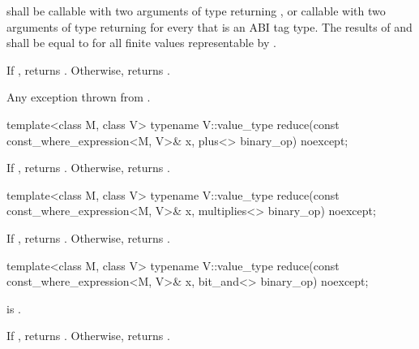 \begin{itemdescr}
  \pnum\requires
   shall be callable with two arguments of type  returning , or callable with two arguments of type  returning  for every  that is an ABI tag type. The results of  and  shall be equal to  for all finite values  representable by .

  \pnum\returns
  If , returns . Otherwise, returns  \forallmaskedi.

  \pnum\throws
  Any exception thrown from .
\end{itemdescr}

\begin{itemdecl}
template<class M, class V>
  typename V::value_type reduce(const const_where_expression<M, V>& x, plus<> binary_op) noexcept;
\end{itemdecl}

\begin{itemdescr}
  \pnum\returns
  If , returns . Otherwise, returns  \forallmaskedi.
\end{itemdescr}

\begin{itemdecl}
template<class M, class V>
  typename V::value_type reduce(const const_where_expression<M, V>& x, multiplies<> binary_op) noexcept;
\end{itemdecl}

\begin{itemdescr}
  \pnum\returns
  If , returns . Otherwise, returns  \forallmaskedi.
\end{itemdescr}

\begin{itemdecl}
template<class M, class V>
  typename V::value_type reduce(const const_where_expression<M, V>& x, bit_and<> binary_op) noexcept;
\end{itemdecl}

\begin{itemdescr}
  \pnum\requires
   is .

  \pnum\returns
  If , returns . Otherwise, returns  \forallmaskedi.
\end{itemdescr}

